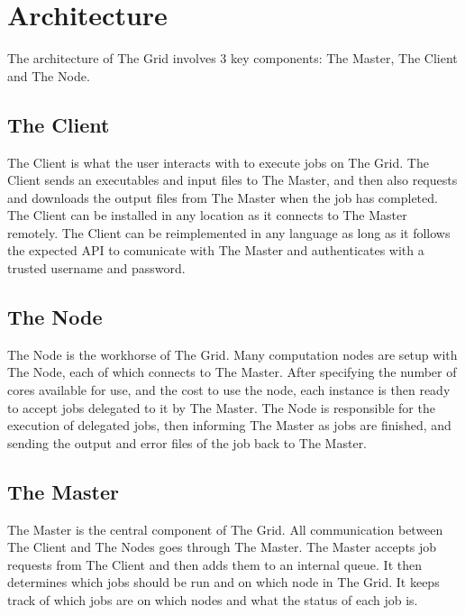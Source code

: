 \chapter{Architecture}
The architecture of The Grid involves 3 key components: The Master, The Client and The Node.

\section{The Client}
The Client is what the user interacts with to execute jobs on The Grid. The Client sends an executables and input files to The Master, and then also requests and downloads the output files from The Master when the job has completed. The Client can be installed in any location as it connects to The Master remotely. The Client can be reimplemented in any language as long as it follows the expected API to comunicate with The Master and authenticates with a trusted username and password.

\section{The Node}
The Node is the workhorse of The Grid. Many computation nodes are setup with The Node, each of which connects to The Master. After specifying the number of cores available for use, and the cost to use the node, each instance is then ready to accept jobs delegated to it by The Master. The Node is responsible for the execution of delegated jobs, then informing The Master as jobs are finished, and sending the output and error files of the job back to The Master.

\section{The Master}
The Master is the central component of The Grid. All communication between The Client and The Nodes goes through The Master. The Master accepts job requests from The Client and then adds them to an internal queue. It then determines which jobs should be run and on which node in The Grid. It keeps track of which jobs are on which nodes and what the status of each job is.
